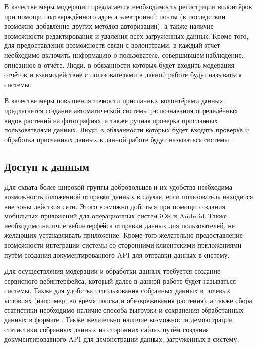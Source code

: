 \nwln
В качестве меры модерации предлагается необходимость регистрации волонтёров при помощи подтверждённого адреса электронной почты (в последствии возможно добавление других методов авторизации), а также наличие возможности редактирования и удаления всех загруженных данных.
Кроме того, для предоставления возможности связи с волонтёрами, в каждый отчёт необходимо включить информацию о пользователе, совершившем наблюдение, описанное в отчёте.
Люди, в обязанности которых будет входить модерация отчётов и взаимодействие с пользователями в данной работе будут называться  системы.

\nwln
В качестве меры повышения точности присланных волонтёрами данных предлагается создание автоматической системы распознавания определённых видов растений на фотографиях, а также ручная проверка присланных пользователями данных.
Люди, в обязанности которых будет входить проверка и обработка присланных данных в данной работе будут называться  системы. \\

\subsection{Доступ к данным}

\tab
Для охвата более широкой группы добровольцев и их удобства необходима возможность отложенной отправки данных в случае, если пользователь находится вне зоны действия сети.
Этого возможно добиться при помощи создания мобильных приложений для операционных систем iOS и Android.
Также необходимо наличие вебинтерфейса отправки данных для пользователей, не желающих устанавливать приложение.
Кроме того желательно предоставление возможности интеграции системы со сторонними клиентскими приложениями путём создания документированного API для отправки данных в систему.

\nwln
Для осуществления модерации и обработки данных требуется создание сервисного вебинтерфейса, который далее в данной работе будет называться  системы.
Также для удобства использования собранных данных в полевых условиях (например, во время поиска и обезвреживания растения), а также сбора статистики необходимо наличие способа выгрузки и сохранения обработанных данных в формате .
Также желательно наличие возможности демонстрации статистики собранных данных на сторонних сайтах путём создания документированного API для демонстрации данных, загруженных в систему. \\

